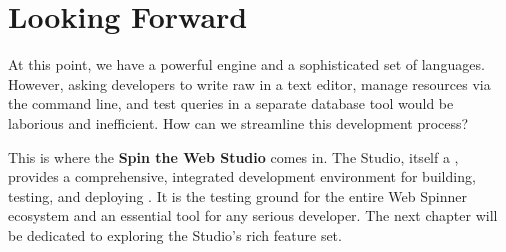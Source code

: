 \section{Looking Forward}
\label{sec:webspinner-forward}

At this point, we have a powerful engine and a sophisticated set of languages. However, asking developers to write raw \wbdl{} in a text editor, manage resources via the command line, and test queries in a separate database tool would be laborious and inefficient. How can we streamline this development process?

This is where the \textbf{Spin the Web Studio} comes in. The Studio, itself a \webbaselet{}, provides a comprehensive, integrated development environment for building, testing, and deploying . It is the testing ground for the entire Web Spinner ecosystem and an essential tool for any serious developer. The next chapter will be dedicated to exploring the Studio's rich feature set.
